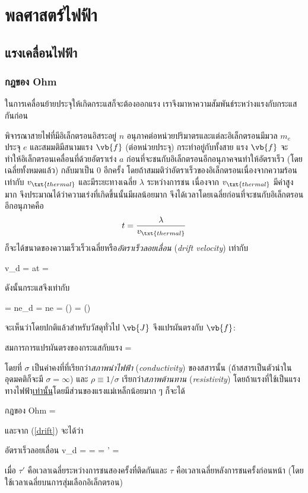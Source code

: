 \chapter{พลศาสตร์ไฟฟ้า}
\section{แรงเคลื่อนไฟฟ้า}
\subsection{กฎของ Ohm}

ในการเคลื่อนย้ายประจุให้เกิดกระแสก็จะต้องออกแรง เราจึงมาหาความสัมพันธ์ระหว่างแรงกับกระแสกันก่อน

พิจารณาสายไฟที่มีอิเล็กตรอนอิสระอยู่ $n$ อนุภาคต่อหน่วยปริมาตรและแต่ละอิเล็กตรอนมีมวล $m_e$ ประจุ $e$ และสมมติมีสนามแรง $\vb{f}$ (ต่อหน่วยประจุ) กระทำอยู่กับทั้งสาย แรง $\vb{f}$ จะทำให้อิเล็กตรอนเคลื่อนที่ด้วยอัตราเร่ง $a$ ก่อนที่จะชนกับอิเล็กตรอนอีกอนุภาคจนทำให้อัตราเร็ว (โดยเฉลี่ยทั้งหมดแล้ว) กลับมาเป็น $0$ อีกครั้ง โดยถ้าสมมติว่าอัตราเร็วของอิเล็กตรอนเนื่องจากความร้อนเท่ากับ $v_\txt{thermal}$ และมีระยะทางเฉลี่ย $\lambda$ ระหว่างการชน เนื่องจาก $v_\txt{thermal}$ มีค่าสูงมาก จึงประมาณได้ว่าความเร่งที่เกิดขึ้นนั้นมีผลน้อยมาก จึงได้เวลาโดยเฉลี่ยก่อนที่จะชนกับอิเล็กตรอนอีกอนุภาคคือ
\[ 
t = \frac{\lambda}{v_\txt{thermal}} 
\]
ก็จะได้ขนาดของความเร็วเร็วเฉลี่ยหรือ\emph{อัตราเร็วลอยเลื่อน} (\emph{drift velocity}) เท่ากับ
\begin{eqnobox}
    v_d = at = \label{drift}
\end{eqnobox}
ดังนั้นกระแสจึงเท่ากับ
\begin{eqnobox} 
     = ne_d = ne = \ab() = \ab()\label{ohmapprox} 
\end{eqnobox}
จะเห็นว่าโดยปกติแล้วสำหรับวัสดุทั่วไป $\vb{J}$ จึงแปรผันตรงกับ $\vb{f}$:
\begin{eqbox}{สมการการแปรผันตรงของกระแสกับแรง} 
     = \sigma{} 
\end{eqbox}
โดยที่ $\sigma$ เป็นค่าคงที่ที่เรียกว่า\emph{สภาพนำไฟฟ้า} (\emph{conductivity}) ของสสารนั้น (ถ้าสสารเป็นตัวนำในอุดมคติก็จะมี $\sigma = \infty$) และ $\rho\equiv 1/\sigma$ เรียกว่า\emph{สภาพต้านทาน} (\emph{resistivity}) โดยถ้าแรงที่ใช้เป็นแรงทางไฟฟ้า\underline{เท่านั้น}โดยมีส่วนของแรงแม่เหล็กน้อยมาก ๆ ก็จะได้
\begin{ieqbox}{กฎของ Ohm} 
     = \sigma{}\label{ohme} 
\end{ieqbox}
และจาก (\ref{drift}) จะได้ว่า
\begin{eqbox}{อัตราเร็วลอยเลื่อน}
    v_d =  = \lambda = \tau' = \tau\label{drifte}
\end{eqbox}
เมื่อ $\tau'$ คือเวลาเฉลี่ยระหว่างการชนสองครั้งที่ติดกันและ $\tau$ คือเวลาเฉลี่ยหลังการชนครั้งก่อนหน้า (โดยใช้เวลาเฉลี่ยบนการสุ่มเลือกอิเล็กตรอน)

